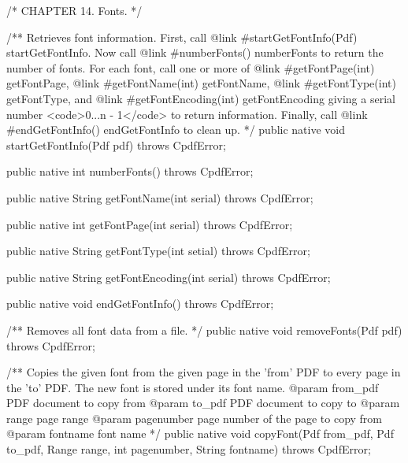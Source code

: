 /* CHAPTER 14. Fonts. */

/** Retrieves font information. First, call {@link #startGetFontInfo(Pdf)
startGetFontInfo}. Now call {@link #numberFonts() numberFonts} to return
the number of fonts. For each font, call one or more of
{@link #getFontPage(int) getFontPage}, {@link #getFontName(int)
getFontName}, {@link #getFontType(int) getFontType}, and
{@link #getFontEncoding(int) getFontEncoding} giving a serial number
<code>0...n - 1</code> to return information. Finally, call
{@link #endGetFontInfo() endGetFontInfo} to clean up. */
public native void startGetFontInfo(Pdf pdf) throws CpdfError;

public native int numberFonts() throws CpdfError;

public native String getFontName(int serial) throws CpdfError;

public native int getFontPage(int serial) throws CpdfError;

public native String getFontType(int setial) throws CpdfError;

public native String getFontEncoding(int serial) throws CpdfError;

public native void endGetFontInfo() throws CpdfError;

/** Removes all font data from a file. */
public native void removeFonts(Pdf pdf) throws CpdfError;

/** Copies the given font
from the given page in the 'from' PDF to every page in the 'to' PDF. The
new font is stored under its font name.
@param from_pdf PDF document to copy from
@param to_pdf PDF document to copy to
@param range page range
@param pagenumber page number of the page to copy from
@param fontname font name */
public native void copyFont(Pdf from_pdf, Pdf to_pdf, Range range,
                            int pagenumber, String fontname)
    throws CpdfError;
